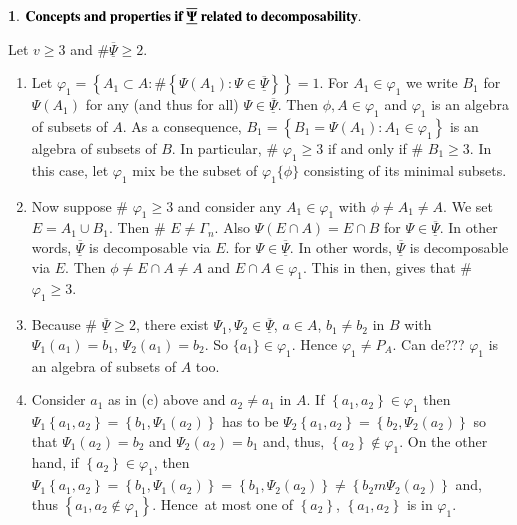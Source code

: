 \documentclass[a4paper,12pt]{article}
\theoremstyle{definition}
\theoremstyle{underlinethm}
\theoremstyle{definition}
\newtheorem{subsubsec}{}[subsection]
\begin{document}
\begin{subsubsec}\label{subsubsection-3.1.3}
${{\text{\bf Concepts and properties if}}~ \mathbf{\underline{\overline{\Psi}}}~ \text{\bf related to decomposability}}.$

Let $v\geq 3$ and $\# \underline{\overline{\Psi}} \geq 2$.

\begin{enumerate}[label=(\alph*)]

\item  Let $\varphi_{1} = \left\{A_{1} \subset A : \# \left\{\Psi (A_{1}) : \Psi \in \underline{\overline{\Psi}} \right\} \right\} =1$. For $A_{1} \in \varphi_{1}$ we write $B_{1}$ for $\Psi(A_{1})$ for any (and thus for all) $\Psi \in \underline{\overline{\Psi}}$. Then $\phi, A \in \varphi_{1}$ and $\varphi_{1}$ is an algebra of subsets of $A$. As a consequence, $B_{1} = \left\{B_{1}= \Psi(A_{1}) : A_{1} \in \varphi_{1} \right\}$ is an algebra of subsets of $B$. In particular, \# $\varphi_{1} \geq 3$ if and only if \# $B_{1} \geq 3$. In this case, let $\varphi_{1}$ mix be the subset of $\varphi_{1}\{\phi\}$ consisting of its minimal subsets.

\item Now suppose \# $\varphi_{1} \geq 3$ and consider any $A_{1} \in \varphi_{1}$ with $\phi \neq A_{1}\neq A$. We set $E = A_{1} \cup B_{1}$. Then \# $E \neq \Gamma_{n}$. Also $\Psi(E \cap A) = E \cap B$ for $\Psi \in \underline{\overline{\Psi}}$. In other words, $\underline{\overline{\Psi}}$ is decomposable via $E$. for $\Psi \in \underline{\overline{\Psi}}$. In other words, $\underline{\overline{\Psi}}$ is decomposable via $E$. Then $\phi \neq E \cap A \neq A$ and $E \cap A \in \varphi_{1}$. This in then, gives that \# $\varphi_{1} \geq 3$. 

\item Because \# $\underline{\overline{\Psi}} \geq 2$, there exist $\Psi_{1}, \Psi_{2} \in \underline{\overline{\Psi}}$, $a \in A$, $b_{1} \neq b_{2}$ in $B$ with $\Psi_{1}(a_{1}) = b_{1}$, $\Psi_{2}(a_{1}) = b_{2}$. So $\{a_{1}\} \in \varphi_{1}$. Hence $\varphi_{1} \neq P_{A}$. Can de??? $\varphi_{1}$ is an algebra of subsets of $A$ too.

\item Consider $a_{1}$ as in (c) above and $a_{2}\neq a_{1}$ in $A$. If $\left\{a_{1}, a_{2} \right\} \in \varphi_{1}$ then $\Psi_{1}\left\{a_{1}, a_{2} \right\} = \left\{b_{1},\Psi_{1} (a_{2})\right\}$ has to be $\Psi_{2}\left\{a_{1}, a_{2} \right\} = \left\{b_{2},\Psi_{2} (a_{2})\right\}$ so that $\Psi_{1}(a_{2}) = b_{2}$ and $\Psi_{2}(a_{2}) = b_{1}$ and, thus, $\left\{a_{2}\right\} \notin \varphi_{1}$. On the other hand, if $\left\{a_{2}\right\} \in \varphi_{1}$, then $\Psi_{1}\left\{a_{1}, a_{2}\right\} = \left\{b_{1}, \Psi_{1}(a_{2})\right\} = \left\{b_{1}, \Psi_{2}(a_{2})\right\} \neq \left\{b_{2}m \Psi_{2}(a_{2})\right\}$ and, thus $\left\{a_{1}, a_{2} \notin \varphi_{1}\right\}$. Hence\, at most one of $\left\{a_{2}\right\}$, $\left\{a_{1}, a_{2}\right\}$ is in $\varphi_{1}$.


\end{enumerate}
\end{subsubsec}
\end{document}
